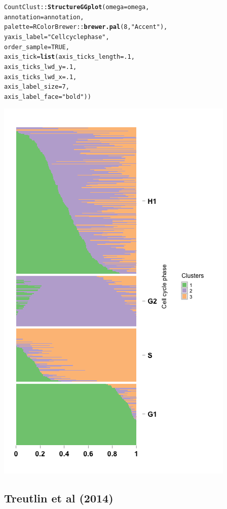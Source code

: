\documentclass[12pt]{article}\usepackage[]{graphicx}\usepackage[usenames,dvipsnames]{color}
\makeatletter
\newcommand{\hlnum}[1]{\textcolor[rgb]{0.686,0.059,0.569}{#1}}%
\newcommand{\hlstr}[1]{\textcolor[rgb]{0.192,0.494,0.8}{#1}}%
\newcommand{\hlopt}[1]{\textcolor[rgb]{0,0,0}{#1}}%
\newcommand{\hlstd}[1]{\textcolor[rgb]{0.345,0.345,0.345}{#1}}%
\newcommand{\hlkwc}[1]{\textcolor[rgb]{0.333,0.667,0.333}{#1}}%
\newcommand{\hlkwd}[1]{\textcolor[rgb]{0.737,0.353,0.396}{\textbf{#1}}}%
\newenvironment{kframe}{%
 \def\at@end@of@kframe{}%
 \ifinner\ifhmode%
  \def\at@end@of@kframe{\end{minipage}}%
  \begin{minipage}{\columnwidth}%
 \fi\fi%
 \def\FrameCommand##1{\hskip\@totalleftmargin \hskip-\fboxsep
 \colorbox{shadecolor}{##1}\hskip-\fboxsep
     \hskip-\linewidth \hskip-\@totalleftmargin \hskip\columnwidth}%
 \MakeFramed {\advance\hsize-\width
   \@totalleftmargin\z@ \linewidth\hsize
   \@setminipage}}%
 {\par\unskip\endMakeFramed%
 \at@end@of@kframe}
\newenvironment{knitrout}{}{} %
\makeatother
\begin{document}
\begin{knitrout}
\begin{kframe}
\begin{alltt}
\hlstd{CountClust}\hlopt{::}\hlkwd{StructureGGplot}\hlstd{(}\hlkwc{omega} \hlstd{= omega,}
                \hlkwc{annotation} \hlstd{= annotation,}
                \hlkwc{palette} \hlstd{= RColorBrewer}\hlopt{::}\hlkwd{brewer.pal}\hlstd{(}\hlnum{8}\hlstd{,} \hlstr{"Accent"}\hlstd{),}
                \hlkwc{yaxis_label} \hlstd{=} \hlstr{"Cell cycle phase"}\hlstd{,}
                \hlkwc{order_sample} \hlstd{=} \hlnum{TRUE}\hlstd{,}
                \hlkwc{axis_tick} \hlstd{=} \hlkwd{list}\hlstd{(}\hlkwc{axis_ticks_length} \hlstd{=} \hlnum{.1}\hlstd{,}
                                 \hlkwc{axis_ticks_lwd_y} \hlstd{=} \hlnum{.1}\hlstd{,}
                                 \hlkwc{axis_ticks_lwd_x} \hlstd{=} \hlnum{.1}\hlstd{,}
                                 \hlkwc{axis_label_size} \hlstd{=} \hlnum{7}\hlstd{,}
                                 \hlkwc{axis_label_face} \hlstd{=} \hlstr{"bold"}\hlstd{))}
\end{alltt}
\end{kframe}
\includegraphics[width=3 in,height=5 in]{figure/structure_leng_3-1} 

\end{knitrout}

\subsection{Treutlin et al (2014)}
\end{document}
